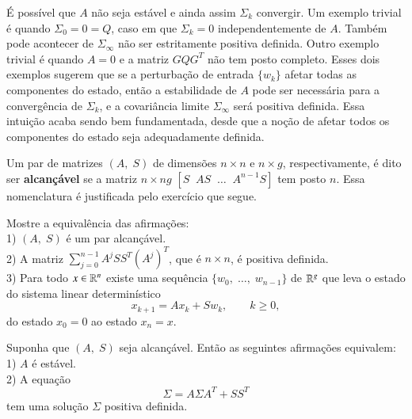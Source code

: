 \begin{Obs}\label{3.3.7}
É possível que $A$ não seja estável e ainda assim $\Sigma_k$ convergir. Um exemplo trivial é quando $\Sigma_0=0=Q$, caso em que $\Sigma_k=0$ independentemente de $A$. Também pode acontecer de $\Sigma_\infty$ não ser estritamente positiva definida. Outro exemplo trivial é quando $A=0$ e a matriz $GQG^T$ não tem posto completo. Esses dois exemplos sugerem que se a perturbação de entrada $\{w_k\}$ afetar todas as componentes do estado, então a estabilidade de $A$ pode ser necessária para a convergência de $\Sigma_k$, e a covariância limite $\Sigma_\infty$ será positiva definida. Essa intuição acaba sendo bem fundamentada, desde que a noção de afetar todos os componentes do estado seja adequadamente definida.
\end{Obs}
Um par de matrizes $(A,\;S)$ de dimensões $n\times n$ e $n\times g$, respectivamente, é dito ser \textbf{alcançável} se a matriz $n\times ng$ $[S\;\;AS\;\;\dots\;\;A^{n-1}S]$ tem posto $n$. Essa nomenclatura é justificada pelo exercício que segue.
\begin{Exercicio}\label{3.3.8}
Mostre a equivalência das afirmações:\\
1) $(A,\;S)$ é um par alcançável.\\
2) A matriz $\sum_{j=0}^{n-1}A^jSS^T(A^j)^T$, que é $n\times n$, é positiva definida.\\
3) Para todo $x\in\mathbb{R}^n$ existe uma sequência $\{w_0,\;\dots,\;w_{n-1}\}$ de $\mathbb{R}^g$ que leva o estado do sistema linear determinístico
\[
	x_{k+1}=Ax_k+Sw_k,\qquad k \ge0,
\]
do estado $x_0=0$ ao estado $x_n=x$.
\end{Exercicio}
\begin{Teo}\label{3.3.9}
Suponha que $(A,\;S)$ seja alcançável. Então as seguintes afirmações equivalem:\\
1) $A$ é estável.\\
2) A equação
\begin{equation}\label{3.3.10}
	\Sigma = A\Sigma A^T+ SS^T
\end{equation}
tem uma solução $\Sigma$ positiva definida.
\end{Teo}
